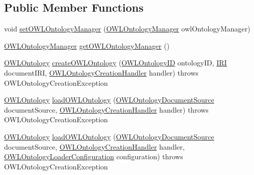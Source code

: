 \subsection*{Public Member Functions}
\begin{DoxyCompactItemize}
\item 
void \hyperlink{interfaceorg_1_1semanticweb_1_1owlapi_1_1model_1_1_o_w_l_ontology_factory_abf3b97bacdcf053f307cd800fc538a21}{set\-O\-W\-L\-Ontology\-Manager} (\hyperlink{interfaceorg_1_1semanticweb_1_1owlapi_1_1model_1_1_o_w_l_ontology_manager}{O\-W\-L\-Ontology\-Manager} owl\-Ontology\-Manager)
\item 
\hyperlink{interfaceorg_1_1semanticweb_1_1owlapi_1_1model_1_1_o_w_l_ontology_manager}{O\-W\-L\-Ontology\-Manager} \hyperlink{interfaceorg_1_1semanticweb_1_1owlapi_1_1model_1_1_o_w_l_ontology_factory_afe0ba8c0c92f1cc53d416cd0377fd58c}{get\-O\-W\-L\-Ontology\-Manager} ()
\item 
\hyperlink{interfaceorg_1_1semanticweb_1_1owlapi_1_1model_1_1_o_w_l_ontology}{O\-W\-L\-Ontology} \hyperlink{interfaceorg_1_1semanticweb_1_1owlapi_1_1model_1_1_o_w_l_ontology_factory_a847c6b374465ffaa65f8b6013f932636}{create\-O\-W\-L\-Ontology} (\hyperlink{classorg_1_1semanticweb_1_1owlapi_1_1model_1_1_o_w_l_ontology_i_d}{O\-W\-L\-Ontology\-I\-D} ontology\-I\-D, \hyperlink{classorg_1_1semanticweb_1_1owlapi_1_1model_1_1_i_r_i}{I\-R\-I} document\-I\-R\-I, \hyperlink{interfaceorg_1_1semanticweb_1_1owlapi_1_1model_1_1_o_w_l_ontology_factory_1_1_o_w_l_ontology_creation_handler}{O\-W\-L\-Ontology\-Creation\-Handler} handler)  throws O\-W\-L\-Ontology\-Creation\-Exception
\item 
\hyperlink{interfaceorg_1_1semanticweb_1_1owlapi_1_1model_1_1_o_w_l_ontology}{O\-W\-L\-Ontology} \hyperlink{interfaceorg_1_1semanticweb_1_1owlapi_1_1model_1_1_o_w_l_ontology_factory_a56cc47cebde4ac161c5b2b5053aceafc}{load\-O\-W\-L\-Ontology} (\hyperlink{interfaceorg_1_1semanticweb_1_1owlapi_1_1io_1_1_o_w_l_ontology_document_source}{O\-W\-L\-Ontology\-Document\-Source} document\-Source, \hyperlink{interfaceorg_1_1semanticweb_1_1owlapi_1_1model_1_1_o_w_l_ontology_factory_1_1_o_w_l_ontology_creation_handler}{O\-W\-L\-Ontology\-Creation\-Handler} handler)  throws O\-W\-L\-Ontology\-Creation\-Exception
\item 
\hyperlink{interfaceorg_1_1semanticweb_1_1owlapi_1_1model_1_1_o_w_l_ontology}{O\-W\-L\-Ontology} \hyperlink{interfaceorg_1_1semanticweb_1_1owlapi_1_1model_1_1_o_w_l_ontology_factory_a4870a6a6701141ec76c448050f9105d6}{load\-O\-W\-L\-Ontology} (\hyperlink{interfaceorg_1_1semanticweb_1_1owlapi_1_1io_1_1_o_w_l_ontology_document_source}{O\-W\-L\-Ontology\-Document\-Source} document\-Source, \hyperlink{interfaceorg_1_1semanticweb_1_1owlapi_1_1model_1_1_o_w_l_ontology_factory_1_1_o_w_l_ontology_creation_handler}{O\-W\-L\-Ontology\-Creation\-Handler} handler, \hyperlink{classorg_1_1semanticweb_1_1owlapi_1_1model_1_1_o_w_l_ontology_loader_configuration}{O\-W\-L\-Ontology\-Loader\-Configuration} configuration)  throws O\-W\-L\-Ontology\-Creation\-Exception

\end{DoxyCompactItemize}
